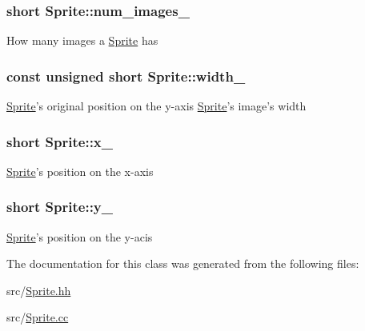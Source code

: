 \hypertarget{classSprite_a5a6ae065c674bfb85b6d90c1cbfcdca2}{
\subsubsection[{num\-\_\-images\-\_\-}]{\setlength{\rightskip}{0pt plus 5cm}short Sprite\-::num\-\_\-images\-\_\-\hspace{0.3cm}{\ttfamily [protected]}}}\label{classSprite_a5a6ae065c674bfb85b6d90c1cbfcdca2}
How many images a \hyperlink{classSprite}{Sprite} has \hypertarget{classSprite_ac0c8b57b52d82f2753c1726e51ed0490}{
\subsubsection[{width\-\_\-}]{\setlength{\rightskip}{0pt plus 5cm}const unsigned short Sprite\-::width\-\_\-\hspace{0.3cm}{\ttfamily [protected]}}}\label{classSprite_ac0c8b57b52d82f2753c1726e51ed0490}
\hyperlink{classSprite}{Sprite}'s original position on the y-\/axis \hyperlink{classSprite}{Sprite}'s image's width \hypertarget{classSprite_ac66af2df2e5990c07252b8aa0d384346}{
\subsubsection[{x\-\_\-}]{\setlength{\rightskip}{0pt plus 5cm}short Sprite\-::x\-\_\-\hspace{0.3cm}{\ttfamily [protected]}}}\label{classSprite_ac66af2df2e5990c07252b8aa0d384346}
\hyperlink{classSprite}{Sprite}'s position on the x-\/axis \hypertarget{classSprite_a3ad6d07d083c5bbb2e819caa31d2bc6f}{
\subsubsection[{y\-\_\-}]{\setlength{\rightskip}{0pt plus 5cm}short Sprite\-::y\-\_\-\hspace{0.3cm}{\ttfamily [protected]}}}\label{classSprite_a3ad6d07d083c5bbb2e819caa31d2bc6f}
\hyperlink{classSprite}{Sprite}'s position on the y-\/acis 

The documentation for this class was generated from the following files\-:\begin{DoxyCompactItemize}
\item 
src/\hyperlink{Sprite_8hh}{Sprite.\-hh}\item 
src/\hyperlink{Sprite_8cc}{Sprite.\-cc}\end{DoxyCompactItemize}
